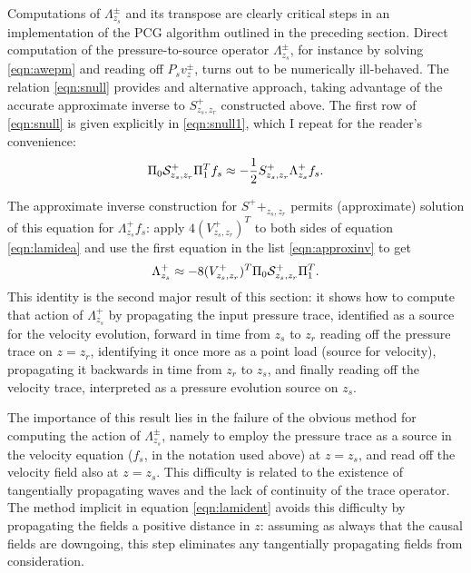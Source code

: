 Computations of $\Lambda^{\pm}_{z_s}$ and its transpose are clearly critical steps in an
implementation of the PCG algorithm outlined in the preceding section.
Direct computation of the pressure-to-source operator $\Lambda^{\pm}_{z_s}$, for instance by solving
\ref{eqn:awepm} and reading off $P_sv^{\pm}_{z}$, turns out to be
numerically ill-behaved. The relation \ref{eqn:snull} provides and
alternative approach, taking advantage of the accurate approximate
inverse to $S^+_{z_s,z_r}$ constructed above. The first row of
\ref{eqn:snull} is given explicitly in \ref{eqn:snull1}, which I
repeat for the reader's convenience:
\begin{equation}
  \label{eqn:lamidea}
  \Pi_0{\cal S}^+_{z_s,z_r}\Pi_1^T f_s \approx  -\frac{1}{2} S^+_{z_s,z_r}\Lambda^+_{z_s}f_s.
\end{equation}

The approximate inverse construction for $S^++_{z_s,z_r}$ permits (approximate)
solution of this equation for $\Lambda^+_{z_s}f_s$: apply
$4(V^{+}_{z_s,z_r})^T$ to both sides of equation \ref{eqn:lamidea} and
use the first equation in the list \ref{eqn:approxinv} to get
\begin{equation}
  \label{eqn:lamident}
  \Lambda^+_{z_s} \approx -8(V^{+}_{z_s,z_r})^T\Pi_0 {\cal S}^+_{z_s,z_r}\Pi_1^T.
\end{equation}
This identity is the second major result of this section: it shows how
to compute that action of $\Lambda^+_{z_s}$ by propagating the input
pressure trace, identified as a source for the velocity evolution,
forward in time from $z_s$ to $z_r$
reading off the pressure trace on $z=z_r$, identifying it once more as
a point load (source for velocity), propagating it backwards in time from $z_r$ to
$z_s$, and finally reading off the velocity trace, interpreted as a
pressure evolution source on $z_s$. 

The importance of this result lies in the failure of the obvious
method for computing the action of $\Lambda^{\pm}_{z_s}$, namely to
employ the pressure trace as a source in the velocity equation ($f_s$,
in the notation used above) at $z=z_s$, and read off the velocity
field also at $z=z_s$. This difficulty is related to the existence of
tangentially propagating waves and the lack of continuity of the trace
operator. The method implicit in equation \ref{eqn:lamident} avoids
this difficulty by propagating the fields a positive distance in $z$:
assuming as always that the causal fields are downgoing, this step
eliminates any tangentially propagating fields from consideration.

